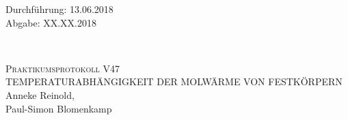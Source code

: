 



\begin{titlepage}
  \begin{flushleft}
 Durchführung: 13.06.2018\\
 Abgabe: XX.XX.2018
  \end{flushleft}


\HRule\\[1,0cm]

 \begin{center}


\textsc{\LARGE Praktikumsprotokoll V47}\\[1.5cm]
\textsc{\huge TEMPERATURABHÄNGIGKEIT DER MOLWÄRME VON FESTKÖRPERN} \\[5,5cm]

Anneke Reinold\footnotemark[1], \\
Paul-Simon Blomenkamp\footnotemark[2] \\[1,0cm]



 \end{center}
\HRule

 \vfill

\end{titlepage}






\printbibliography


